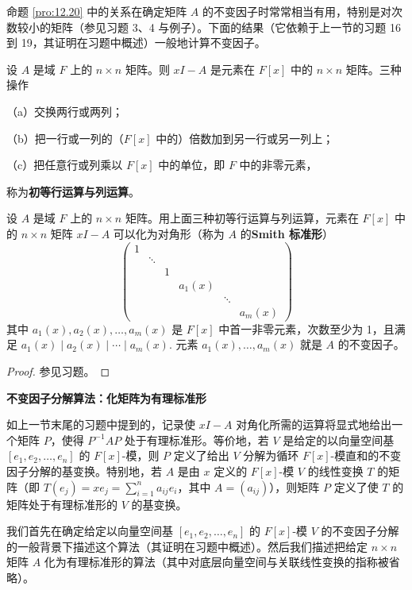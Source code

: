 命题 \ref{pro:12.20} 中的关系在确定矩阵 \(A\) 的不变因子时常常相当有用，特别是对次数较小的矩阵（参见习题 3、4 与例子）。下面的结果（它依赖于上一节的习题 16 到 19，其证明在习题中概述）一般地计算不变因子。

设 \(A\) 是域 \(F\) 上的 \(n \times n\) 矩阵。则 \(xI-A\) 是元素在 \(F[x]\) 中的 \(n \times n\) 矩阵。三种操作

（a）交换两行或两列；

（b）把一行或一列的（\(F[x]\) 中的）倍数加到另一行或另一列上；

（c）把任意行或列乘以 \(F[x]\) 中的单位，即 \(F\) 中的非零元素，

称为\textbf{初等行运算与列运算}。

\begin{theorem}\label{thm:12.21}
设 \(A\) 是域 \(F\) 上的 \(n \times n\) 矩阵。用上面三种初等行运算与列运算，元素在 \(F[x]\) 中的 \(n \times n\) 矩阵 \(xI-A\) 可以化为对角形（称为 \(A\) 的\textbf{Smith 标准形}）
\[
\begin{pmatrix}
1 & & & & \\
& \ddots & & & \\
& & 1 & & \\
& & & a_1(x) & \\
& & & & \ddots & \\
& & & & & a_m(x)
\end{pmatrix}
\]
其中 \(a_1(x), a_2(x), \ldots, a_m(x)\) 是 \(F[x]\) 中首一非零元素，次数至少为 1，且满足 \(a_1(x) \mid a_2(x) \mid \cdots \mid a_m(x)\). 元素 \(a_1(x), \ldots, a_m(x)\) 就是 \(A\) 的不变因子。
\end{theorem}

\begin{proof}
参见习题。
\end{proof}

\noindent\textbf{不变因子分解算法：化矩阵为有理标准形}

如上一节末尾的习题中提到的，记录使 \(xI-A\) 对角化所需的运算将显式地给出一个矩阵 \(P\)，使得 \(P^{-1}AP\) 处于有理标准形。等价地，若 \(V\) 是给定的以向量空间基 \([e_1, e_2, \ldots, e_n]\) 的 \(F[x]\)-模，则 \(P\) 定义了给出 \(V\) 分解为循环 \(F[x]\)-模直和的不变因子分解的基变换。特别地，若 \(A\) 是由 \(x\) 定义的 \(F[x]\)-模 \(V\) 的线性变换 \(T\) 的矩阵（即 \(T(e_j) = xe_j = \sum_{i=1}^n a_{ij}e_i\)，其中 \(A = (a_{ij})\)），则矩阵 \(P\) 定义了使 \(T\) 的矩阵处于有理标准形的 \(V\) 的基变换。

我们首先在确定给定以向量空间基 \([e_1, e_2, \ldots, e_n]\) 的 \(F[x]\)-模 \(V\) 的不变因子分解的一般背景下描述这个算法（其证明在习题中概述）。然后我们描述把给定 \(n \times n\) 矩阵 \(A\) 化为有理标准形的算法（其中对底层向量空间与关联线性变换的指称被省略）。

